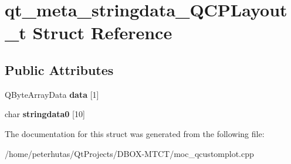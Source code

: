\hypertarget{structqt__meta__stringdata___q_c_p_layout__t}{}\section{qt\+\_\+meta\+\_\+stringdata\+\_\+\+Q\+C\+P\+Layout\+\_\+t Struct Reference}
\label{structqt__meta__stringdata___q_c_p_layout__t}
\subsection*{Public Attributes}
\begin{DoxyCompactItemize}
\item 
\mbox{\label{structqt__meta__stringdata___q_c_p_layout__t_a133fdcad1faf8247b373a50c8dcb604f}} 
Q\+Byte\+Array\+Data {\bfseries data} \mbox{[}1\mbox{]}
\item 
\mbox{\label{structqt__meta__stringdata___q_c_p_layout__t_ad487cc776f3a79ee6a9f10c234b3ade0}} 
char {\bfseries stringdata0} \mbox{[}10\mbox{]}
\end{DoxyCompactItemize}


The documentation for this struct was generated from the following file\+:\begin{DoxyCompactItemize}
\item 
/home/peterhutas/\+Qt\+Projects/\+D\+B\+O\+X-\/\+M\+T\+C\+T/moc\+\_\+qcustomplot.\+cpp\end{DoxyCompactItemize}
